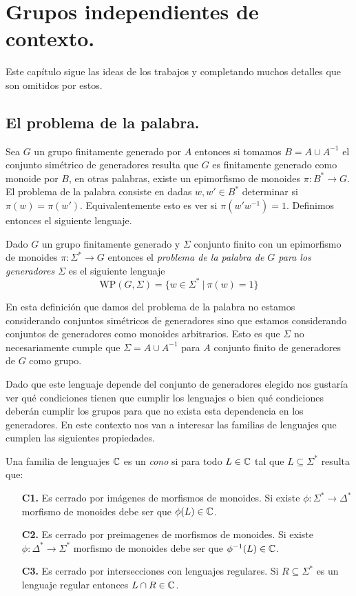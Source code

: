 \documentclass[tesis.tex]{subfiles}
\begin{document}
\chapter{Grupos independientes de contexto.}
Este capítulo sigue las ideas de los trabajos \cite{muller1983groups} y \cite{muller1985theory} completando muchos detalles que son omitidos por estos.

\section{El problema de la palabra.}


Sea $G$ un grupo finitamente generado por $A$ entonces si tomamos $B = A \cup A^{-1}$ el conjunto simétrico de generadores resulta que $G$ es finitamente generado como monoide por $B$, en otras palabras, existe un epimorfismo de monoides $\pi:B^* \to G$.
El problema de la palabra consiste en dadas $w,w' \in B^*$ determinar si $\pi(w) {=} \pi(w')$.
Equivalentemente esto es ver si $\pi(w'w^{-1}) = 1$.
Definimos entonces el siguiente lenguaje.

\begin{deff}
	Dado $G$ un grupo finitamente generado 
	y $\Sigma$ conjunto finito con un epimorfismo de monoides $\pi:\Sigma^* \to G$ entonces
	el \emph{problema de la palabra de $G$ para los generadores $\Sigma$} es el siguiente lenguaje	
	\[ 
	\text{WP} (G, \Sigma) = \{ w \in \Sigma^* \ | \ \pi(w)= 1 \}
	\]
\end{deff}

\begin{obs}
	En esta definición que damos del problema de la palabra no estamos considerando conjuntos simétricos de generadores sino que estamos considerando conjuntos de generadores como monoides arbitrarios.
	Esto es que $\Sigma$ no necesariamente cumple que $\Sigma = A \cup A^{-1}$ para $A$ conjunto finito de generadores de $G$ como grupo.
\end{obs}


Dado que este lenguaje depende del conjunto de generadores elegido nos gustaría ver qué condiciones tienen que cumplir los lenguajes o bien qué condiciones deberán cumplir los grupos para que no exista esta dependencia en los generadores.
En este contexto nos van a interesar las familias de lenguajes que cumplen las siguientes propiedades.
\medskip
\begin{deff}
	Una familia de lenguajes $\mathbb{C}$ es un \emph{cono} si para todo $L \in \mathbb{C}$ tal que $L \subseteq \Sigma^*$ resulta que:
	\begin{itemize}
		\item[\textbf{C1.}] Es cerrado por imágenes de morfismos de monoides. 
		Si existe $\phi:\Sigma^* \to \Delta^*$ morfismo de monoides debe ser que $\phi(L) \in \mathbb{C}$.
		\item[\textbf{C2.}] Es cerrado por preimagenes de morfismos de monoides. 
		Si existe $\phi:\Delta^* \to \Sigma^*$ morfismo de monoides  debe ser que $\phi^{-1}(L) \in \mathbb{C}$. 
		\item[\textbf{C3.}] Es cerrado por intersecciones con lenguajes regulares. 
		Si $R \subseteq \Sigma^*$ es un lenguaje regular entonces $L \cap R \in \mathbb{C}$.
	\end{itemize}
\end{deff} 
\end{document}
